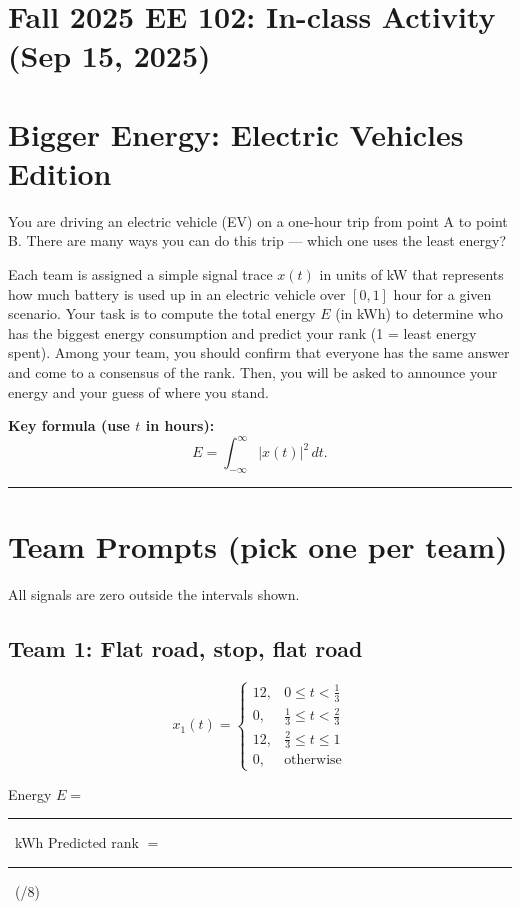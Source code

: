 \documentclass[11pt]{article}
\newcommand{\Eblank}{\rule{3cm}{0.4pt}}
\newcommand{\Rankblank}{\rule{3cm}{0.4pt}}
\begin{document}
\section*{Fall 2025 EE 102: In-class Activity (Sep 15, 2025)}

\section*{Bigger Energy: Electric Vehicles Edition}
You are driving an electric vehicle (EV) on a one-hour trip from point A to point B. There are many ways you can do this trip --- which one uses the least energy?
\medskip

\noindent Each team is assigned a simple signal trace \(x(t)\) in units of \si{kW} that represents how much battery is used up in an electric vehicle over \([0,1]\) hour for a given scenario. Your task is to compute the total energy \(E\) (in \si{kWh}) to determine who has the biggest energy consumption and predict your rank (1 = least energy spent). Among your team, you should confirm that everyone has the same answer and come to a consensus of the rank. Then, you will be asked to announce your energy and your guess of where you stand.

\medskip

\textbf{Key formula (use \(t\) in hours):}
\[
E  = \int_{-\infty}^{\infty} |x(t)|^2 \,dt.
\]

\bigskip
\hrule
\bigskip

\section*{Team Prompts (pick one per team)}
All signals are zero outside the intervals shown.

\subsection*{Team 1: Flat road, stop, flat road}
\[
x_1(t)=
\begin{cases}
12, & 0 \le t < \tfrac{1}{3} \\
0, & \tfrac{1}{3} \le t < \tfrac{2}{3} \\
12, & \tfrac{2}{3} \le t \le 1 \\
0, & \text{otherwise}
\end{cases}
\]
\begin{tcolorbox}[title=Team 1: Record your results]
Energy \(E=\) \Eblank\ \si{kWh} \quad\quad Predicted rank \(=\) \Rankblank\ (/8)
\end{tcolorbox}
\end{document}
